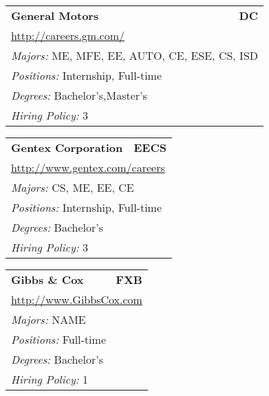 \documentclass[twoside]{article}
\begin{document}
\begin{center}
\begin{multicols}{3}
\begin{FlushLeft}
\begin{minipage}{.9\columnwidth}
\end{minipage}
 
\begin{minipage}{.9\columnwidth}\begin{tabularx}{.95\columnwidth}{Xr}
                 {\Large\bf General Motors} & {\Large\bf DC}\\
    \multicolumn{2}{p{.95\columnwidth}}{\url{http://careers.gm.com/}}\\
    \multicolumn{2}{p{.95\columnwidth}}{\emph{Majors:} ME, MFE, EE, AUTO, CE, ESE, CS, ISD}\\
    \multicolumn{2}{p{.95\columnwidth}}{\emph{Positions:} Internship, Full-time}\\
    \multicolumn{2}{p{.95\columnwidth}}{\emph{Degrees:} Bachelor's,Master's}\\
    \multicolumn{2}{p{.95\columnwidth}}{\emph{Hiring Policy:} 3}\\
    \end{tabularx}
    
\end{minipage}
 
\begin{minipage}{.9\columnwidth}\begin{tabularx}{.95\columnwidth}{Xr}
                 {\Large\bf Gentex Corporation} & {\Large\bf EECS}\\
    \multicolumn{2}{p{.95\columnwidth}}{\url{http://www.gentex.com/careers}}\\
    \multicolumn{2}{p{.95\columnwidth}}{\emph{Majors:} CS, ME, EE, CE}\\
    \multicolumn{2}{p{.95\columnwidth}}{\emph{Positions:} Internship, Full-time}\\
    \multicolumn{2}{p{.95\columnwidth}}{\emph{Degrees:} Bachelor's}\\
    \multicolumn{2}{p{.95\columnwidth}}{\emph{Hiring Policy:} 3}\\
    \end{tabularx}
    
\end{minipage}
 
\begin{minipage}{.9\columnwidth}\begin{tabularx}{.95\columnwidth}{Xr}
                 {\Large\bf Gibbs \& Cox} & {\Large\bf FXB}\\
    \multicolumn{2}{p{.95\columnwidth}}{\url{http://www.GibbsCox.com}}\\
    \multicolumn{2}{p{.95\columnwidth}}{\emph{Majors:} NAME}\\
    \multicolumn{2}{p{.95\columnwidth}}{\emph{Positions:} Full-time}\\
    \multicolumn{2}{p{.95\columnwidth}}{\emph{Degrees:} Bachelor's}\\
    \multicolumn{2}{p{.95\columnwidth}}{\emph{Hiring Policy:} 1}\\
    \end{tabularx}
    

\end{minipage}
\end{FlushLeft}
\end{multicols}
\end{center}
\end{document}
